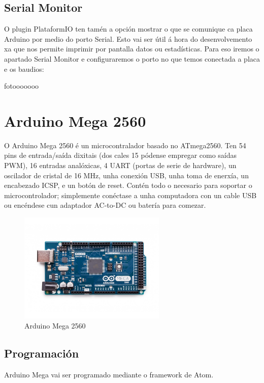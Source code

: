 \documentclass[11pt,twoside]{book}
\begin{document}
\subsection{Serial Monitor}

O plugin PlataformIO ten tamén a opción mostrar o que se comunique ca placa Arduino por medio do porto Serial.
Esto vai ser útil á hora do desenvolvemento xa que nos permite imprimir por pantalla datos ou estadísticas.
 Para eso iremos o apartado Serial Monitor e configuraremos o porto no que temos conectada a placa e os baudios:
 
 fotooooooo

\section{Arduino Mega 2560}

O Arduino Mega 2560 é un microcontralador basado no ATmega2560. Ten 54 pins de entrada/saída dixitais (dos cales 15 pódense empregar como saídas PWM), 16 entradas analóxicas, 4 UART (portas de serie de hardware), un oscilador de cristal de 16 MHz, unha conexión USB, unha toma de enerxía, un encabezado ICSP, e un botón de reset. Contén todo o necesario para soportar o microcontrolador; simplemente conéctase a unha computadora con un cable USB ou encéndese cun adaptador AC-to-DC ou batería para comezar. 

\begin{figure}[H]
	\begin{center}
		\includegraphics[width=7cm]{images/arduino_mega.jpg}
	\end{center}
	\caption{Arduino Mega 2560}
	\label{fig:ArduinoMega}
\end{figure}

\subsection{Programación}

Arduino Mega vai ser programado mediante o framework de Atom.
\end{document}
